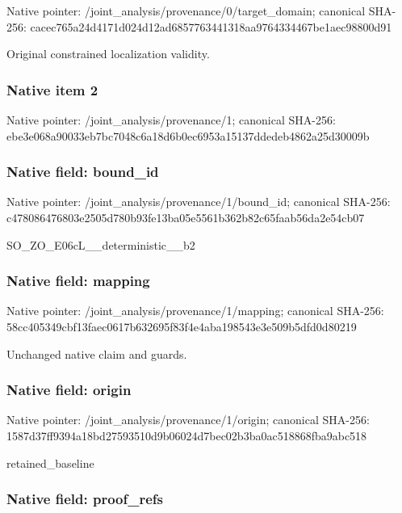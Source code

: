 \documentclass[10pt,a4paper]{article}
\begin{document}
Native pointer: /joint\_analysis/provenan\allowbreak{}ce/0/target\_domain; canonical SHA-256: cacec765a24d4171d024d12a\allowbreak{}d6857763441318aa97643344\allowbreak{}67be1aec98800d91


Original constrained localization validity.


\subsubsection{Native item 2}


Native pointer: /joint\_analysis/provenance/1; canonical SHA-256: ebe3e068a90033eb7bc7048c\allowbreak{}6a18d6b0ec6953a15137dded\allowbreak{}eb4862a25d30009b



\subsubsection{Native field: bound\_id}


Native pointer: /joint\_analysis/provenance/1/bound\_id; canonical SHA-256: c478086476803e2505d780b9\allowbreak{}3fe13ba05e5561b362b82c65\allowbreak{}faab56da2e54cb07


SO\_ZO\_E06cL\_\_deterministic\_\_b2


\subsubsection{Native field: mapping}


Native pointer: /joint\_analysis/provenance/1/mapping; canonical SHA-256: 58cc405349cbf13faec0617b\allowbreak{}632695f83f4e4aba198543e3\allowbreak{}e509b5dfd0d80219


Unchanged native claim and guards.


\subsubsection{Native field: origin}


Native pointer: /joint\_analysis/provenance/1/origin; canonical SHA-256: 1587d37ff9394a18bd275935\allowbreak{}10d9b06024d7bec02b3ba0ac\allowbreak{}518868fba9abc518


retained\_baseline


\subsubsection{Native field: proof\_refs}
\end{document}
